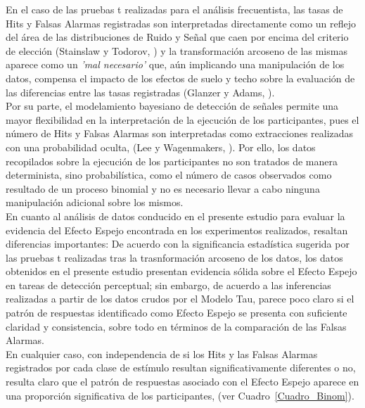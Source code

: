 En el caso de las pruebas t realizadas para el análisis frecuentista, las tasas de Hits y Falsas Alarmas registradas son interpretadas directamente como un reflejo del área de las distribuciones de Ruido y Señal que caen por encima del criterio de elección (Stainslaw y Todorov, \citeyear{Stainslaw1999}) y la transformación arcoseno de las mismas aparece como un \textit{'mal necesario'} que, aún implicando una manipulación de los datos, compensa el impacto de los efectos de suelo y techo sobre la evaluación de las diferencias entre las tasas registradas (Glanzer y Adams, \citeyear{Glanzer1990}). \\ 

Por su parte, el modelamiento bayesiano de detección de señales permite una mayor flexibilidad en la interpretación de la ejecución de los participantes, pues el número de Hits y Falsas Alarmas son interpretadas como extracciones realizadas con una probabilidad oculta, (Lee y Wagenmakers, \citeyear{LeeBook}). Por ello, los datos recopilados sobre la ejecución de los participantes no son tratados de manera determinista, sino probabilística, como el número de casos observados como resultado de un proceso binomial y no es necesario llevar a cabo ninguna manipulación adicional sobre los mismos.\\

En cuanto al análisis de datos conducido en el presente estudio para evaluar la evidencia del Efecto Espejo encontrada en los experimentos realizados, resaltan diferencias importantes: De acuerdo con la significancia estadística sugerida por las pruebas t realizadas tras la trasnformación arcoseno de los datos, los datos obtenidos en el presente estudio presentan evidencia sólida sobre el Efecto Espejo en tareas de detección perceptual; sin embargo, de acuerdo a las inferencias realizadas a partir de los datos crudos por el Modelo Tau, parece poco claro si el patrón de respuestas identificado como Efecto Espejo se presenta con suficiente claridad y consistencia, sobre todo en términos de la comparación de las Falsas Alarmas.\\

En cualquier caso, con independencia de si los Hits y las Falsas Alarmas registrados por cada clase de estímulo resultan significativamente diferentes o no, resulta claro que el patrón de respuestas asociado con el Efecto Espejo aparece en una proporción significativa de los participantes, (ver Cuadro~\ref{Cuadro_Binom}).















